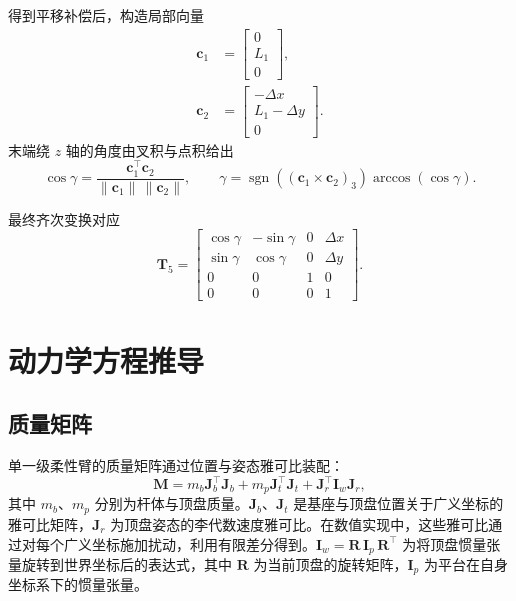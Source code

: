 \documentclass[12pt,a4paper]{article}
\begin{document}
得到平移补偿后，构造局部向量
\begin{align}
  \bm c_1 &= \begin{bmatrix}0\\ L_1\\ 0\end{bmatrix},\\
  \bm c_2 &= \begin{bmatrix}-\Delta x\\ L_1 - \Delta y\\ 0\end{bmatrix}.
\end{align}
末端绕 $z$ 轴的角度由叉积与点积给出
\begin{equation}
  \cos\gamma = \frac{\bm c_1^\top \bm c_2}{\lVert \bm c_1 \rVert\,\lVert \bm c_2 \rVert},\qquad
  \gamma = \operatorname{sgn}\!\left((\bm c_1 \times \bm c_2)_3\right)\arccos(\cos\gamma).
\end{equation}

最终齐次变换对应
\begin{equation}
  \bm T_5 = \begin{bmatrix}
    \cos\gamma & -\sin\gamma & 0 & \Delta x\\
    \sin\gamma & \cos\gamma & 0 & \Delta y\\
    0 & 0 & 1 & 0\\
    0 & 0 & 0 & 1
  \end{bmatrix}.
\end{equation}

\section{动力学方程推导}
\subsection{质量矩阵}\label{sec:mass_matrix}

单一级柔性臂的质量矩阵通过位置与姿态雅可比装配：
\begin{equation}
  \bm M = m_b \bm J_b^\top \bm J_b + m_p \bm J_t^\top \bm J_t + \bm J_r^\top \bm I_w \bm J_r,
\end{equation}
其中 $m_b$、$m_p$ 分别为杆体与顶盘质量。$\bm J_b$、$\bm J_t$ 是基座与顶盘位置关于广义坐标的雅可比矩阵，$\bm J_r$ 为顶盘姿态的李代数速度雅可比。在数值实现中，这些雅可比通过对每个广义坐标施加扰动，利用有限差分得到。$\bm I_w = \bm R\,\bm I_p\,\bm R^\top$ 为将顶盘惯量张量旋转到世界坐标后的表达式，其中 $\bm R$ 为当前顶盘的旋转矩阵，$\bm I_p$ 为平台在自身坐标系下的惯量张量。
\end{document}
